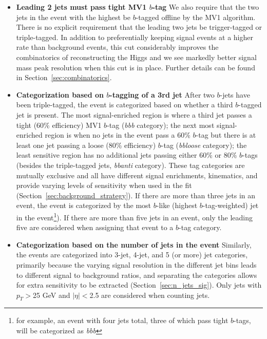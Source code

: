 \begin{itemize}
\item\textbf{Leading 2 jets must pass tight MV1 $b$-tag}
We also require that the two jets in the event with the highest \pt be $b$-tagged
offline by the MV1 algorithm.  There is no explicit requirement that the leading
two jets be trigger-tagged or triple-tagged.
  In addition to preferentially keeping signal events at a higher rate than
background events, this cut considerably improves the combinatorics of reconstructing
the Higgs and we see markedly better signal mass peak resolution when this cut is in
place.  Further details can be found in Section~\ref{sec:combinatorics}.


\item
\textbf{Categorization based on $b$-tagging of a 3rd jet}
After two
$b$-jets have been triple-tagged, the event is categorized based on whether
a third $b$-tagged jet is present.  The most signal-enriched region is where
a third jet passes a tight (60\% efficiency) MV1 $b$-tag (\textit{bbb} category); the next most
signal-enriched region is when no jets in the event pass a 60\% $b$-tag
but there is at least one jet passing a loose (80\% efficiency) $b$-tag (\textit{bbloose} category);
the least sensitive region has no additional jets passing either 60\% or 
80\% $b$-tags (besides the triple-tagged jets, \textit{bbanti} category).  These tag categories are
mutually exclusive and all have different signal enrichments, kinematics, 
and provide varying levels of sensitivity when used in the fit (Section~\ref{sec:background_strategy}).
If there are more than three jets in an event, the event is categorized
by the most $b$-like (highest $b$-tag-weighted) jet in the event\footnote{for
example, an event with four jets total, three of which pass tight $b$-tags,
will be categorized as \textit{bbb}}).  If there are more than five
jets in an event, only the leading five are considered when assigning that event
to a $b$-tag category.


\item
\textbf{Categorization based on the number of jets in the event}
Similarly, the events are categorized into 3-jet, 4-jet, and 5 (or more) jet
categories, primarily because the varying signal resolution in the different
jet bins leads to different signal to background ratios, and separating
the categories allows for extra sensitivity to be extracted (Section~\ref{sec:n_jets_sig}).
Only jets with $p_T>$25 GeV and $|\eta|<$2.5 are considered when counting jets.


\end{itemize}
